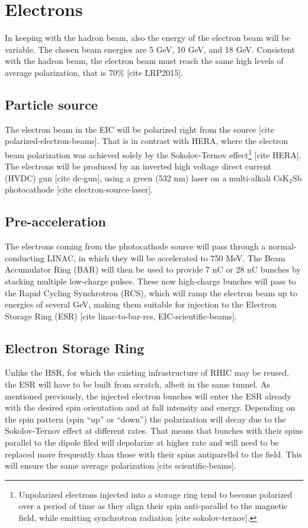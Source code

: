 \section{Electrons}
In keeping with the hadron beam, also the energy of the electron beam will be variable. The chosen beam energies are 5 GeV, 10 GeV, and 18 GeV. Consistent with the hadron beam, the electron beam must reach the same high levels of average polarization, that is 70\% [cite LRP2015]. 

\subsection{Particle source}
The electron beam in the EIC will be polarized right from the source [cite polarized-electron-beams]. That is in contrast with HERA, where the electron beam polarization was achieved solely by the Sokolov-Ternov effect\footnote{Unpolarized electrons injected into a storage ring tend to become polarized over a period of time as they align their spin anti-parallel to the magnetic field, while emitting synchrotron radiation [cite sokolov-ternov].} [cite HERA]. The electrons will be produced by an inverted high voltage direct current (HVDC) gun [cite dc-gun], using a green (532 nm) laser on a multi-alkali CsK$_2$Sb photocathode [cite electron-source-laser]. 

\subsection{Pre-acceleration}
The electrons coming from the photocathode source will pass through a normal-conducting LINAC, in which they will be accelerated to 750 MeV. The Beam Accumulator Ring (BAR) will then be used to provide 7 nC or 28 nC bunches by stacking multiple low-charge pulses. These now high-charge bunches will pass to the Rapid Cycling Synchrotron (RCS), which will ramp the electron beam up to energies of several GeV, making them suitable for injection to the Electron Storage Ring (ESR) [cite linac-to-bar-rcs, EIC-scientific-beams].

\subsection{Electron Storage Ring}
Unlike the HSR, for which the existing infrastructure of RHIC may be reused, the ESR will have to be built from scratch, albeit in the same tunnel. As mentioned previously, the injected electron bunches will enter the ESR already with the desired spin orientation and at full intensity and energy. Depending on the spin pattern (spin \enquote{up} or \enquote{down}) the polarization will decay due to the Sokolov-Ternov effect at different rates. That means that bunches with their spins parallel to the dipole filed will depolarize at higher rate and will need to be replaced more frequently than those with their spins antiparellel to the field. This will ensure the same average polarization [cite scientific-beams].

